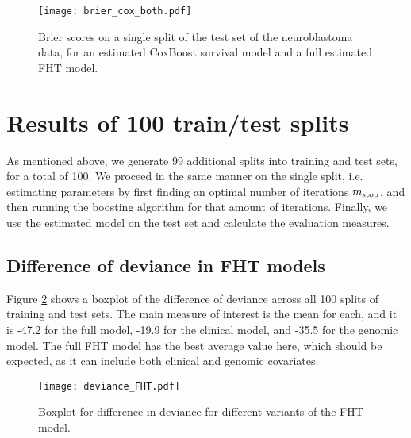 \begin{figure}
\caption{Brier scores on a single split of the test set of the neuroblastoma data, for an estimated CoxBoost survival model and a full estimated FHT model.}
\label{fig:brier-cox-both}
\centering\texttt{[image: brier\_cox\_both.pdf]}
\end{figure}




\section{Results of 100 train/test splits}
As mentioned above, we generate 99 additional splits into training and test sets, for a total of 100.
We proceed in the same manner on the single split, i.e. estimating parameters by first finding an optimal number of iterations $m_{\text{stop}}$, and then running the boosting algorithm for that amount of iterations.
Finally, we use the estimated model on the test set and calculate the evaluation measures.

\subsection{Difference of deviance in FHT models}
Figure \ref{fig:neuroblastoma-deviances} shows a boxplot of the difference of deviance across all 100 splits of training and test sets.
The main measure of interest is the mean for each, and it is -47.2 for the full model, -19.9 for the clinical model, and -35.5 for the genomic model.
The full FHT model has the best average value here, which should be expected, as it can include both clinical and genomic covariates.

\begin{figure}
\caption{Boxplot for difference in deviance for different variants of the FHT model.}
\label{fig:neuroblastoma-deviances}
\centering
\texttt{[image: deviance\_FHT.pdf]}
\end{figure}


